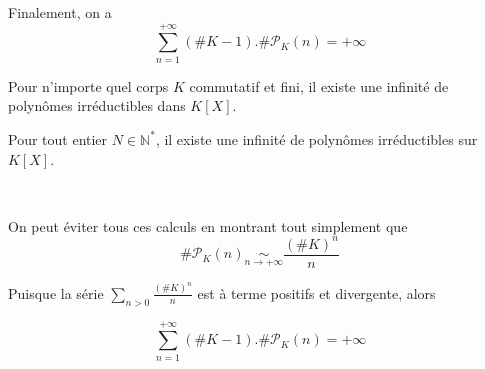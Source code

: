 Finalement, on a
\[ \underset{n = 1}{\overset{+ \infty}{\sum}} (\#K - 1) .\#\mathcal{P}_K (n)
   = + \infty \]


Pour n'importe quel corps $K$ commutatif et fini, il existe une infinit{\'e}
de polyn{\^o}mes irr{\'e}ductibles dans $K [X]$.


Pour tout entier $N \in \mathbb{N}^{\ast}$, il existe une infinit{\'e} de
polyn{\^o}mes irr{\'e}ductibles sur $K [X]$.

\


On peut {\'e}viter tous ces calculs en montrant tout simplement que
\[ \#\mathcal{P}_K (n) \underset{n \rightarrow + \infty}{\sim}
   \frac{(\#K)^n}{n} \]


Puisque la s{\'e}rie $\underset{n > 0}{\sum} \frac{(\#K)^n}{n}$ est {\`a}
terme positifs et divergente, alors


\[ \underset{n = 1}{\overset{+ \infty}{\sum}} (\#K - 1) .\#\mathcal{P}_K (n)
   = + \infty \]